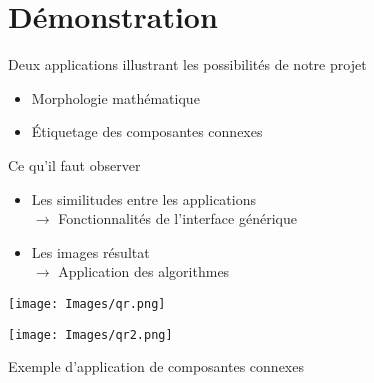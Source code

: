 \section{Démonstration}

\begin{frame}
\begin{minipage}{0.66\textwidth}
	Deux applications illustrant les possibilités de notre projet
	\begin{itemize}
		\item Morphologie mathématique 
		\item Étiquetage des composantes connexes
	\end{itemize}
	
	Ce qu'il faut observer
	\begin{itemize}
		\item Les similitudes entre les applications \\
            $\longrightarrow$ Fonctionnalités de l'interface générique
		\item Les images résultat \\
            $\longrightarrow$ Application des algorithmes
	\end{itemize}
\end{minipage}
\begin{minipage}{0.3\textwidth}
\begin{center}
\texttt{[image: Images/qr.png]}

\texttt{[image: Images/qr2.png]}

\scriptsize Exemple d'application de composantes connexes
\end{center}
\end{minipage}
\end{frame}
